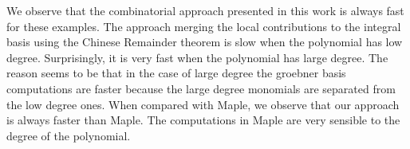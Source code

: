 \documentclass[a4paper,11pt]{amsart}%
\theoremstyle{definition}
\theoremstyle{plain}
\theoremstyle{remark}
\begin{document}
We observe that the combinatorial approach presented in this work is always fast for these examples. The approach merging the local contributions to the integral basis using the Chinese Remainder theorem is slow when the polynomial has low degree. Surprisingly, it is very fast when the polynomial has large degree. The reason seems to be that in the case of large degree the groebner basis computations are faster because the large degree monomials are separated from the low degree ones. When compared with Maple, we observe that our approach is always faster than Maple. The computations in Maple are very sensible to the degree of the polynomial.



\end{document}
